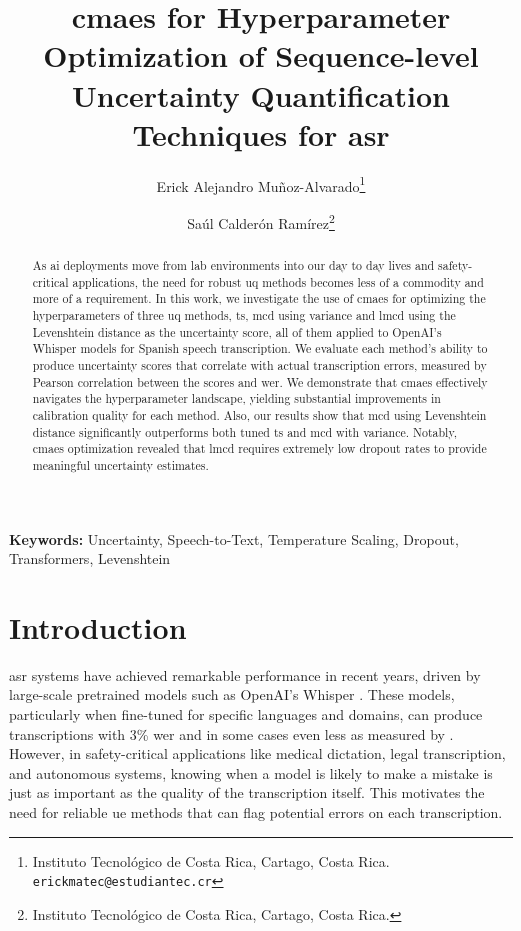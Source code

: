 \documentclass[11pt]{article}
\begin{document}
\title{\acrshort{cmaes} for Hyperparameter Optimization of Sequence-level Uncertainty Quantification Techniques for \acrshort{asr}}

\author{
  Erick Alejandro Muñoz-Alvarado\thanks{Instituto Tecnológico de Costa Rica, Cartago, Costa Rica. \texttt{erickmatec@estudiantec.cr}}
  \and
  Saúl Calderón Ramírez\thanks{Instituto Tecnológico de Costa Rica, Cartago, Costa Rica.}
}

\date{}

\maketitle

\begin{abstract}
As \acrshort{ai} deployments move from lab environments into our day to day lives and safety-critical applications, the need for robust \acrshort{uq} methods becomes less of a commodity and more of a requirement. In this work, we investigate the use of \acrfull{cmaes} for optimizing the hyperparameters of three \acrshort{uq} methods, \acrfull{ts}, \acrfull{mcd} using variance and \acrfull{lmcd} using the Levenshtein distance as the uncertainty score, all of them applied to OpenAI's Whisper models for Spanish speech transcription. We evaluate each method's ability to produce uncertainty scores that correlate with actual transcription errors, measured by Pearson correlation between the scores and \acrlong{wer}. We demonstrate that \acrshort{cmaes} effectively navigates the hyperparameter landscape, yielding substantial improvements in calibration quality for each method. Also, our results show that \acrshort{mcd} using Levenshtein distance significantly outperforms both tuned \acrshort{ts} and \acrshort{mcd} with variance. Notably, \acrshort{cmaes} optimization revealed that \acrshort{lmcd} requires extremely low dropout rates to provide meaningful uncertainty estimates.
\end{abstract}

\noindent\textbf{Keywords:} Uncertainty, Speech-to-Text, Temperature Scaling, Dropout, Transformers, Levenshtein

\listoftodos
\section{Introduction}

\acrfull{asr} systems have achieved remarkable performance in recent years, driven by large-scale pretrained models such as OpenAI's Whisper \cite{radford2023robust}. These models, particularly when fine-tuned for specific languages and domains, can produce transcriptions with 3\% \acrfull{wer} and in some cases even less as measured by \cite{srivastav2025open}. However, in safety-critical applications like medical dictation, legal transcription, and autonomous systems, knowing when a model is likely to make a mistake is just as important as the quality of the transcription itself\cite{koenecke2024careless}. This motivates the need for reliable \acrfull{ue} methods that can flag potential errors on each transcription.
\end{document}
